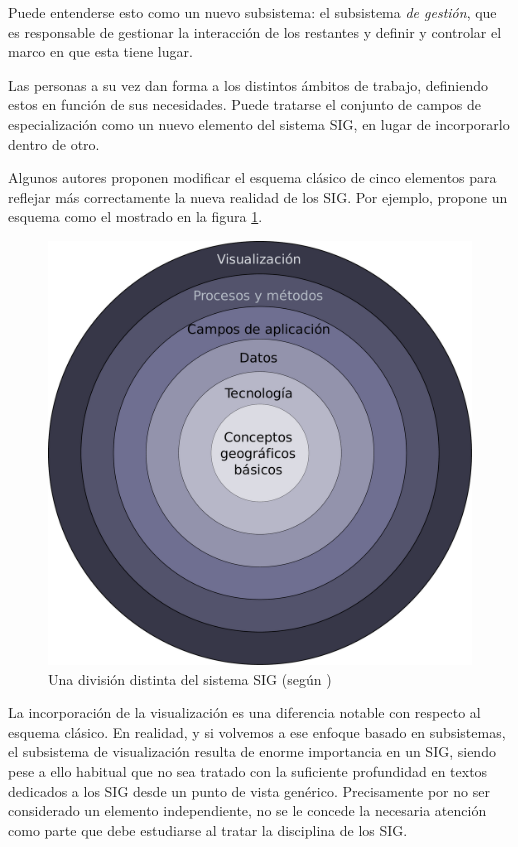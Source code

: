Puede entenderse esto como un nuevo subsistema: el subsistema \emph{de gestión}, que es responsable de gestionar la interacción de los restantes y definir y controlar el marco en que esta tiene lugar.

Las personas a su vez dan forma a los distintos ámbitos de trabajo, definiendo estos en función de sus necesidades. Puede tratarse el conjunto de campos de especialización como un nuevo elemento del sistema SIG, en lugar de incorporarlo dentro de otro. 

Algunos autores proponen modificar el esquema clásico de cinco elementos para reflejar más correctamente la nueva realidad de los SIG. Por ejemplo, \cite{webGISEvolve} propone un esquema como el mostrado en la figura \ref{Fig:Elementos_SIG2}.

\begin{figure}[h]   
\centering
\includegraphics[width=.55\mycolumnwidth]{Introduccion_fundamentos/Elementos_SIG2.pdf}
\caption{\small Una división distinta del sistema SIG (según \cite{webGISEvolve})}
\label{Fig:Elementos_SIG2} 
\end{figure}

La incorporación de la visualización es una diferencia notable con respecto al esquema clásico. En realidad, y si volvemos a ese enfoque basado en subsistemas, el subsistema de visualización resulta de enorme importancia en un SIG, siendo pese a ello habitual que no sea tratado con la suficiente profundidad en textos dedicados a los SIG desde un punto de vista genérico. Precisamente por no ser considerado un elemento independiente, no se le concede la necesaria atención como parte que debe estudiarse al tratar la disciplina de los SIG.


